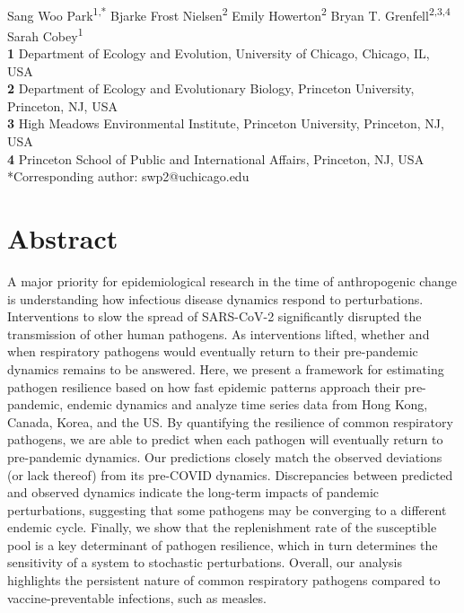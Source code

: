\documentclass[12pt]{article}
\date{\today}
\begin{document}
\begin{flushleft}{
	\Large
	\textbf{}
}
\newline
\\
Sang Woo Park\textsuperscript{1,*}
Bjarke Frost Nielsen\textsuperscript{2}
Emily Howerton\textsuperscript{2}
Bryan T. Grenfell\textsuperscript{2,3,4}
Sarah Cobey\textsuperscript{1}
\bigskip
\\
\textbf{1} Department of Ecology and Evolution, University of Chicago, Chicago, IL, USA
\\
\textbf{2} Department of Ecology and Evolutionary Biology, Princeton University, Princeton, NJ, USA
\\
\textbf{3} High Meadows Environmental Institute, Princeton University, Princeton, NJ, USA
\\
\textbf{4} Princeton School of Public and International Affairs, Princeton, NJ, USA
\bigskip
*Corresponding author: swp2@uchicago.edu
\end{flushleft}

\section*{Abstract}

A major priority for epidemiological research in the time of anthropogenic change is understanding how infectious disease dynamics respond to perturbations.
Interventions to slow the spread of SARS-CoV-2 significantly disrupted the transmission of other human pathogens. 
As interventions lifted, whether and when respiratory pathogens would eventually return to their pre-pandemic dynamics remains to be answered.
Here, we present a framework for estimating pathogen resilience based on how fast epidemic patterns approach their pre-pandemic, endemic dynamics and analyze time series data from Hong Kong, Canada, Korea, and the US.
By quantifying the resilience of common respiratory pathogens, we are able to predict when each pathogen will eventually return to pre-pandemic dynamics.
Our predictions closely match the observed deviations (or lack thereof) from its pre-COVID dynamics.
Discrepancies between predicted and observed dynamics indicate the long-term impacts of pandemic perturbations, suggesting that some pathogens may be converging to a different endemic cycle.
Finally, we show that the replenishment rate of the susceptible pool is a key determinant of pathogen resilience, which in turn determines the sensitivity of a system to stochastic perturbations.
Overall, our analysis highlights the persistent nature of common respiratory pathogens compared to vaccine-preventable infections, such as measles.
\end{document}
